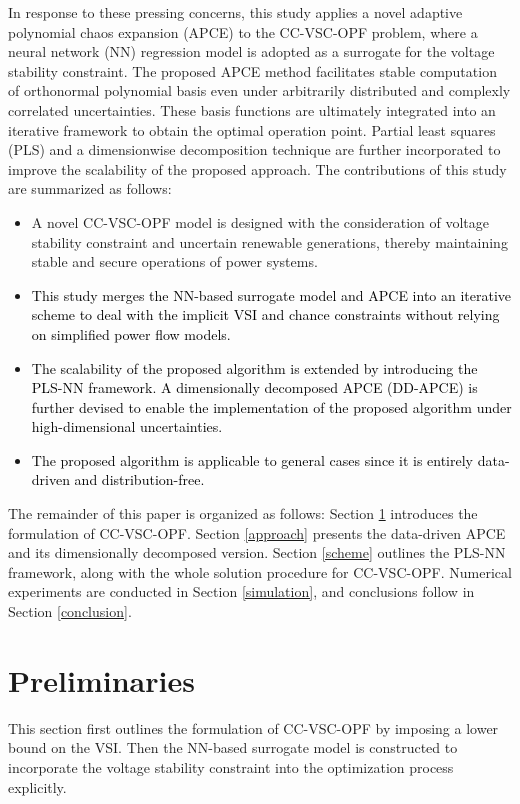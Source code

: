 \documentclass[journal]{IEEEtran}
\theoremstyle{definition}
\theoremstyle{remark}
\begin{document}
In response to these pressing concerns, this study applies a novel adaptive polynomial chaos expansion (APCE) \cite{lee2020practical} to the CC-VSC-OPF problem, where a neural network (NN) regression model is adopted as a surrogate for the voltage stability constraint. The proposed APCE method facilitates stable computation of orthonormal polynomial basis even under arbitrarily distributed and complexly correlated uncertainties. These basis functions are ultimately integrated into an iterative framework to obtain the optimal operation point. Partial least squares (PLS) and a dimensionwise decomposition technique are further incorporated to improve the scalability of the proposed approach. The contributions of this study are summarized as follows:
\begin{itemize}
\item A novel CC-VSC-OPF model is designed with the consideration of voltage stability constraint and uncertain renewable generations, thereby maintaining stable and secure operations of power systems. 
\item \textcolor{black}{This study merges the NN-based surrogate model and APCE into an iterative scheme to deal with the implicit VSI and chance constraints without relying on simplified power flow models.}
\item \textcolor{black}{The scalability of the proposed algorithm is extended by introducing the PLS-NN framework. A dimensionally decomposed APCE (DD-APCE) is further devised to enable the implementation of the proposed algorithm under high-dimensional uncertainties.} 
\item \textcolor{black}{The proposed algorithm is applicable to general cases since it is entirely data-driven and distribution-free.}
\end{itemize}
The remainder of this paper is organized as follows: Section \ref{preliminary} introduces the formulation of CC-VSC-OPF. Section \ref{approach} presents the data-driven APCE and its dimensionally decomposed version. Section \ref{scheme} outlines the PLS-NN framework, along with the whole solution procedure for CC-VSC-OPF. Numerical experiments are conducted in Section \ref{simulation}, and conclusions follow in Section \ref{conclusion}. 
\section{Preliminaries}\label{preliminary}
This section first outlines the formulation of CC-VSC-OPF by imposing a lower bound on the VSI. Then the NN-based surrogate model is constructed to incorporate the voltage stability constraint into the optimization process explicitly.  
\vspace{5pt}
\end{document}

